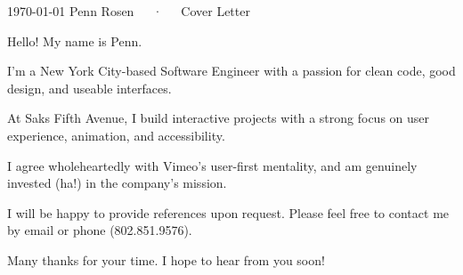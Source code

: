 \documentclass[12pt, letterpaper]{awesome-cv}
\newcommand{\companyname}{Vimeo}
\begin{document}
\makecvheader[R]

\makecvfooter
  {\today}
  {Penn Rosen~~~·~~~Cover Letter}
  {}

\makelettertitle

\begin{cvletter}

Hello! My name is Penn.

I'm a New York City-based Software Engineer with a passion for clean code, good design, and useable interfaces.




At Saks Fifth Avenue, I build interactive projects with a strong focus on user experience, animation, and accessibility.

I agree wholeheartedly with \companyname's user-first mentality, and am genuinely invested (ha!) in the company's mission. 


I will be happy to provide references upon request. Please feel free to contact me by email or phone (802.851.9576).

Many thanks for your time. I hope to hear from you soon! 

\end{cvletter}


\makeletterclosing
\end{document}
